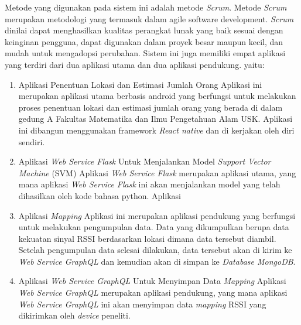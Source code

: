 Metode yang digunakan pada sistem ini adalah metode \textit{Scrum}. Metode \textit{Scrum} merupakan metodologi yang termasuk dalam agile software development. \textit{Scrum} dinilai dapat menghasilkan kualitas perangkat lunak yang baik sesuai dengan keinginan pengguna, dapat digunakan dalam proyek besar maupun kecil, dan mudah untuk mengadopsi perubahan. Sistem ini juga memiliki empat aplikasi yang terdiri dari dua aplikasi utama dan dua aplikasi pendukung. yaitu:
\begin{enumerate}
	\item Aplikasi Penentuan Lokasi dan Estimasi Jumlah Orang
	      \newline Aplikasi ini merupakan aplikasi utama berbasis android yang berfungsi untuk melakukan proses penentuan lokasi dan estimasi jumlah orang yang berada di dalam gedung A Fakultas Matematika dan Ilmu Pengetahuan Alam USK. Aplikasi ini dibangun menggunakan framework \textit{React native} dan di kerjakan oleh diri sendiri.

	\item Aplikasi \textit{Web Service Flask} Untuk Menjalankan Model \textit{Support Vector Machine} (SVM)
	      \newline Aplikasi \textit{Web Service Flask} merupakan aplikasi utama, yang mana aplikasi \textit{Web Service Flask} ini akan menjalankan model yang telah dihasilkan oleh kode bahasa python. Aplikasi

	\item Aplikasi \textit{Mapping}
	      \newline Aplikasi ini merupakan aplikasi pendukung yang berfungsi untuk melakukan pengumpulan data. Data yang dikumpulkan berupa data kekuatan sinyal RSSI berdasarkan lokasi dimana data tersebut diambil. Setelah pengumpulan data selesai dilakukan, data tersebut akan di kirim ke \textit{Web Service GraphQL} dan kemudian akan di simpan ke \textit{Database MongoDB}.

	\item Aplikasi \textit{Web Service GraphQL} Untuk Menyimpan Data \textit{Mapping}
	      \newline Aplikasi \textit{Web Service GraphQL} merupakan aplikasi pendukung, yang mana aplikasi \textit{Web Service GraphQL} ini akan menyimpan data \textit{mapping} RSSI yang dikirimkan oleh \textit{device} peneliti.

\end{enumerate}
